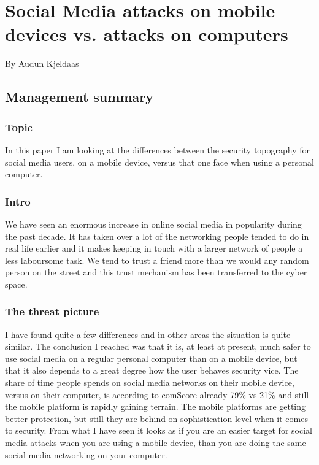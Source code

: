 \chapter[Social Media Attacks]{Social Media attacks on mobile devices vs. attacks on computers}
\small{By Audun Kjeldaas}
\section*{Management summary}
\subsection*{Topic}
In this paper I am looking at the differences between the security topography for social media users, on a mobile device, versus that one face when using a personal computer.
\subsection*{Intro}
We have seen an enormous increase in online social media in popularity during the past decade. It has taken over a lot of the networking people tended to do in real life earlier and it makes keeping in touch with a larger network of people a less laboursome task. We tend to trust a friend more than we would any random person on the street and this trust mechanism has been transferred to the cyber space.
\subsection*{The threat picture}
I have found quite a few differences and in other areas the situation is quite similar. The conclusion I reached was that it is, at least at present, much safer to use social media on a regular personal computer than on a mobile device, but that it also depends to a great degree how the user behaves security vice. The share of time people spends on social media networks on their mobile device, versus on their computer, is according to comScore already 79\% vs 21\% \cite{CrossPlatform2016} and still the mobile platform is rapidly gaining terrain. The mobile platforms are getting better protection, but still they are behind on sophistication level when it comes to security. From what I have seen it looks as if you are an easier target for social media attacks when you are using a mobile device, than you are doing the same social media networking on your computer.
